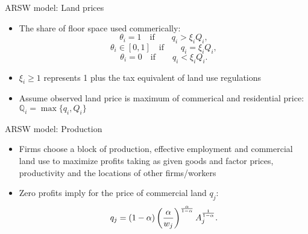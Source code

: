 \documentclass[10pt,notes=hide]{beamer}
\begin{document}
\begin{frame}{ARSW model: Land prices}
\begin{itemize}
\item The share of floor space used commerically:
\begin{equation*} \label{eq_na}
\theta_i = 1 \quad \text{if} \qquad q_i> \xi_i Q_i,
\end{equation*}
\[
\theta_i \in [0,1] \quad  \text{if} \qquad q_i = \xi_i Q_i,
\]
\[
\theta_i = 0 \quad  \text{if} \qquad q_i < \xi_i Q_i.
\]
\item $\xi_i \geq 1$ represents 1 plus the tax equivalent of land use regulations
\item Assume observed land price is maximum of commerical and residential price: $\mathbb{Q}_{i} = \max\{q_i,Q_i\}$
\end{itemize}
\end{frame}
\begin{frame}{ARSW model: Production}
\begin{itemize}
\item Firms choose a block of production, effective employment and commercial land use to maximize profits taking as given goods and factor prices, productivity and the locations of other firms/workers
\item Zero profits imply for the price of commercial land $q_{j}$:
\begin{equation*} \label{eq:zp}
q_{j}=(1-\alpha )\left( \frac{\alpha }{w_{j}}\right) ^{\frac{\alpha }{%
1-\alpha }}A_{j}^{\frac{1}{1-\alpha }}.
\end{equation*}
\end{itemize}
\end{frame}
\end{document}
